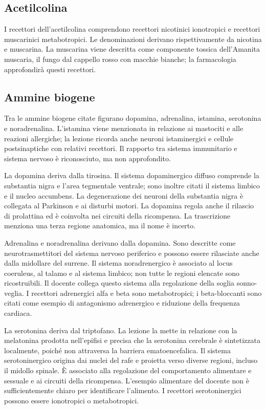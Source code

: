 \subsection{Acetilcolina}

I recettori dell'acetilcolina comprendono recettori nicotinici ionotropici e recettori muscarinici metabotropici. Le denominazioni derivano rispettivamente da nicotina e muscarina. La muscarina viene descritta come componente tossica dell'Amanita muscaria, il fungo dal cappello rosso con macchie bianche; la farmacologia approfondirà questi recettori.

\subsection{Ammine biogene}

Tra le ammine biogene citate figurano dopamina, adrenalina, istamina, serotonina e noradrenalina. L'istamina viene menzionata in relazione ai mastociti e alle reazioni allergiche; la lezione ricorda anche neuroni istaminergici e cellule postsinaptiche con relativi recettori. Il rapporto tra sistema immunitario e sistema nervoso è riconosciuto, ma non approfondito.

La dopamina deriva dalla tirosina. Il sistema dopaminergico diffuso comprende la substantia nigra e l'area tegmentale ventrale; sono inoltre citati il sistema limbico e il nucleo accumbens. La degenerazione dei neuroni della substantia nigra è collegata al Parkinson e ai disturbi motori. La dopamina regola anche il rilascio di prolattina ed è coinvolta nei circuiti della ricompensa. La trascrizione menziona una terza regione anatomica, ma il nome è incerto.

Adrenalina e noradrenalina derivano dalla dopamina. Sono descritte come neurotrasmettitori del sistema nervoso periferico e possono essere rilasciate anche dalla midollare del surrene. Il sistema noradrenergico è associato al locus coeruleus, al talamo e al sistema limbico; non tutte le regioni elencate sono ricostruibili. Il docente collega questo sistema alla regolazione della soglia sonno-veglia. I recettori adrenergici alfa e beta sono metabotropici; i beta-bloccanti sono citati come esempio di antagonismo adrenergico e riduzione della frequenza cardiaca.

La serotonina deriva dal triptofano. La lezione la mette in relazione con la melatonina prodotta nell'epifisi e precisa che la serotonina cerebrale è sintetizzata localmente, poiché non attraversa la barriera ematoencefalica. Il sistema serotoninergico origina dai nuclei del rafe e proietta verso diverse regioni, incluso il midollo spinale. È associato alla regolazione del comportamento alimentare e sessuale e ai circuiti della ricompensa. L'esempio alimentare del docente non è sufficientemente chiaro per identificare l'alimento. I recettori serotoninergici possono essere ionotropici o metabotropici.


